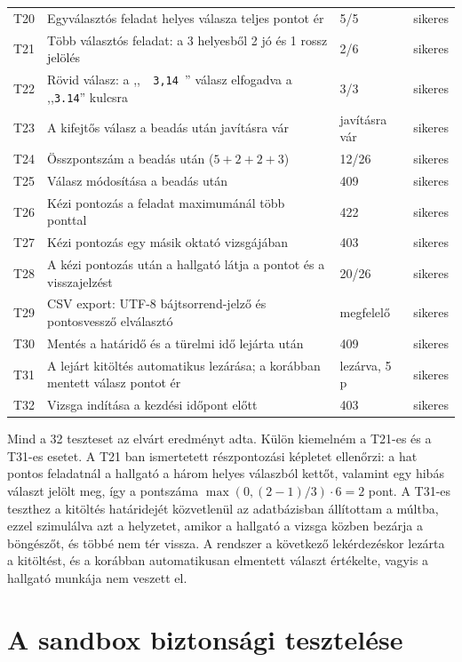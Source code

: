 {\begin{longtable}{@{}lp{9.2cm}p{2.0cm}c@{}}
  T20 & Egyválasztós feladat helyes válasza teljes pontot ér & 5/5 & sikeres \\
  T21 & Több választós feladat: a 3 helyesből 2 jó és 1 rossz jelölés & 2/6 & sikeres \\
  T22 & Rövid válasz: a ,,\texttt{\ \ 3,14\ }'' válasz elfogadva a ,,\texttt{3.14}'' kulcsra & 3/3 & sikeres \\
  T23 & A kifejtős válasz a beadás után javításra vár & javításra vár & sikeres \\
  T24 & Összpontszám a beadás után ($5+2+2+3$) & 12/26 & sikeres \\
  T25 & Válasz módosítása a beadás után & 409 & sikeres \\
  T26 & Kézi pontozás a feladat maximumánál több ponttal & 422 & sikeres \\
  T27 & Kézi pontozás egy másik oktató vizsgájában & 403 & sikeres \\
  T28 & A kézi pontozás után a hallgató látja a pontot és a visszajelzést & 20/26 & sikeres \\
  T29 & CSV export: UTF-8 bájtsorrend-jelző és pontosvessző elválasztó & megfelelő & sikeres \\
  T30 & Mentés a határidő és a türelmi idő lejárta után & 409 & sikeres \\
  T31 & A lejárt kitöltés automatikus lezárása; a korábban mentett válasz pontot ér & lezárva, 5 p & sikeres \\
  T32 & Vizsga indítása a kezdési időpont előtt & 403 & sikeres \\
\end{longtable}
}

Mind a 32 teszteset az elvárt eredményt adta. Külön kiemelném a T21-es és a T31-es esetet. A T21
ban ismertetett részpontozási képletet ellenőrzi: a hat pontos feladatnál a
hallgató a három helyes válaszból kettőt, valamint egy hibás választ jelölt meg, így a pontszáma
$\max(0, (2-1)/3) \cdot 6 = 2$ pont. A T31-es teszthez a kitöltés határidejét közvetlenül az
adatbázisban állítottam a múltba, ezzel szimulálva azt a helyzetet, amikor a hallgató a vizsga
közben bezárja a böngészőt, és többé nem tér vissza. A rendszer a következő lekérdezéskor
lezárta a kitöltést, és a korábban automatikusan elmentett választ értékelte, vagyis a hallgató
munkája nem veszett el.

\section{A sandbox biztonsági tesztelése}
\label{sec:sandbox_teszt}

